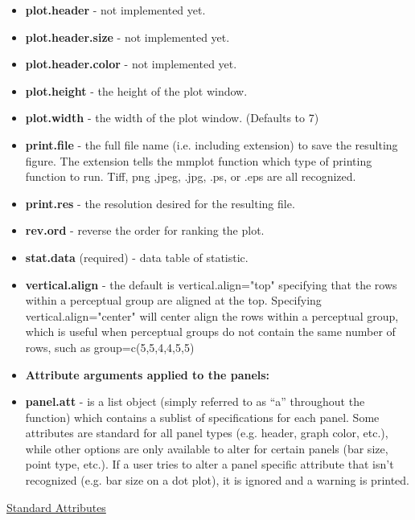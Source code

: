 \documentclass{article}
\begin{document}
\begin{itemize}
\item  \textbf{plot.header} - not implemented yet.
\item  \textbf{plot.header.size} - not implemented yet.
\item  \textbf{plot.header.color} - not implemented yet.
\item  \textbf{plot.height} - the height of the plot window.
\item  \textbf{plot.width} - the width of the plot window. (Defaults to 7)
\item  \textbf{print.file} - the full file name (i.e. including extension) to save the resulting figure. The extension tells the mmplot function which type of printing function to run. Tiff, png ,jpeg, .jpg, .ps, or .eps are all recognized.
\item  \textbf{print.res} - the resolution desired for the resulting file.
\item  \textbf{rev.ord} - reverse the order for ranking the plot.
\item  \textbf{stat.data} (required) - data table of statistic.
\item  \textbf{vertical.align} - the default is vertical.align="top" specifying that the rows within a perceptual group are aligned at the top.  Specifying vertical.align="center" will center align the rows within a perceptual group, which is useful when perceptual groups do not contain the same number of rows, such as group=c(5,5,4,4,5,5)
\item  \textbf{Attribute arguments applied to the panels:}
\item  \textbf{panel.att} - is a list object (simply referred to as ``a'' throughout the function) which contains a sublist of
specifications for each panel. Some attributes are standard for all panel types (e.g. header, graph color, etc.), while
other options are only available to alter for certain panels (bar size, point type, etc.). If a user tries to alter a panel
specific attribute that isn't recognized (e.g. bar size on a dot plot), it is ignored and a warning is printed.
\end{itemize}
\underline{Standard Attributes}
\end{document}
